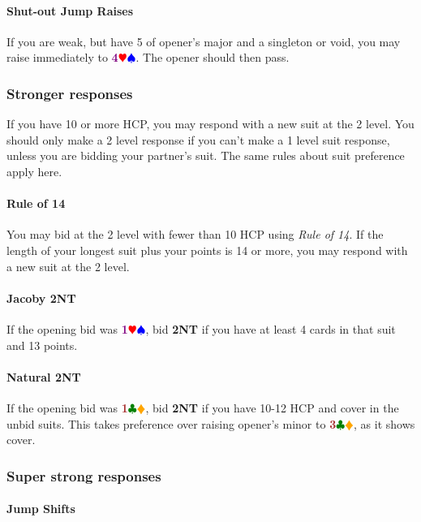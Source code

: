 \documentclass{article}
\newcommand{\Hs}{\textcolor{Red}{$\varheart$}}
\newcommand{\Ss}{\textcolor{Blue}{$\spadesuit$}}
\newcommand{\Ds}{\textcolor{Orange}{$\vardiamond$}}
\newcommand{\Cs}{\textcolor{Green}{$\clubsuit$}}
\newcommand{\NTs}{\textbf{\footnotesize{NT}}}
\newcommand{\NT}[1]{\textbf{#1\NTs}}
\newcommand{\minors}[1]{\textcolor{Brown}{\textbf{#1}}\Cs\Ds}
\newcommand{\majors}[1]{\textcolor{Purple}{\textbf{#1}}\Hs\Ss}
\begin{document}
\paragraph{Shut-out Jump Raises}

If you are weak, but have 5 of opener's major and a singleton or void, you may raise immediately to \majors{4}. The opener should then pass.

\subsubsection{Stronger responses}

If you have 10 or more HCP, you may respond with a new suit at the 2 level. You should only make a 2 level response if you can't make a 1 level suit response, unless you are bidding your partner's suit. The same rules about suit preference apply here.

\paragraph{Rule of 14}
You may bid at the 2 level with fewer than 10 HCP using \emph{Rule of 14}. If the length of your longest suit plus your points is 14 or more, you may respond with a new suit at the 2 level.

\paragraph{Jacoby \NT{2}}

If the opening bid was \majors{1}, bid \NT{2} if you have at least 4 cards in that suit and 13 points.

\paragraph{Natural \NT{2}}
If the opening bid was \minors{1}, bid \NT{2} if you have 10-12 HCP and cover in the unbid suits. This takes preference over raising opener's minor to \minors{3}, as it shows cover.

\subsubsection{Super strong responses}

\paragraph{Jump Shifts}
\end{document}
